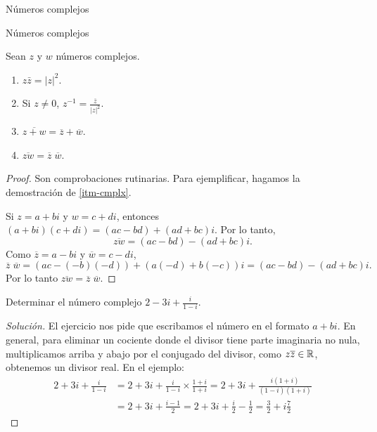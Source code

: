 \begin{chapter}{N\'umeros complejos}
\begin{section}{N\'umeros complejos}
        \begin{proposicion} Sean $z$ y $w$ números complejos.
            \begin{enumerate}
                \item $z\bar{z} = |z|^2$.
                \item Si $z \ne 0$, $z^{-1} = \displaystyle\frac{\overline{z}}{|z|^2}$.
                \item  $\overline{z+w} = \overline{z} + \overline{w}$.
                \item\label{itm-cmplx}  $\overline{zw} = \overline{z}\;  \overline{w}$.
            \end{enumerate}
            \begin{proof}
                Son comprobaciones rutinarias. Para ejemplificar, hagamos la demostración  de \ref{itm-cmplx}.
                
                Si $z = a + bi$ y $w = c +di$, entonces $(a+bi) (c+di) = (ac -bd) + (ad+bc)i$. Por lo tanto,
                \begin{equation*}
                \overline{zw} = (ac -bd) - (ad+bc)i.
                \end{equation*} 
                Como $\overline{z} = a - bi$ y $\overline{w} = c -di$,
                \begin{equation*}
                \overline{z}\;  \overline{w} = (ac -(-b)(-d)) + (a(-d)+b(-c) )i = (ac -bd) - (ad+bc)i.
                \end{equation*} 
                Por lo tanto $	\overline{zw} = \overline{z}\;  \overline{w}$.
            \end{proof}	
        \end{proposicion}
        
        
        \begin{ejercicio*}
            Determinar el número complejo $2- 3i + \displaystyle\frac{i}{1-i}$.
        \end{ejercicio*}
        \begin{proof}[Solución] 
            El  ejercicio nos pide que escribamos el número en el formato $a + bi$. En general, para eliminar un cociente donde el divisor tiene parte imaginaria no nula, multiplicamos arriba y abajo por el conjugado del divisor, como $z\overline{z} \in \mathbb R$, obtenemos un divisor real. En  el ejemplo: 
            \begin{align*}
            2+ 3i + \frac{i}{1-i} &= 2+3i +\frac{i}{1-i}\times\frac{1+i}{1+i}  = 2+3i +\frac{i(1+i)}{(1-i)(1+i)}\\ 
            &=  2+3i +\frac{i-1}{2} = 2+3i +\frac{i}{2}-\frac{1}{2} =\frac{3}{2}+i\frac{7}{2}
            \end{align*}
        \end{proof}
        


\end{section}
\end{chapter}
